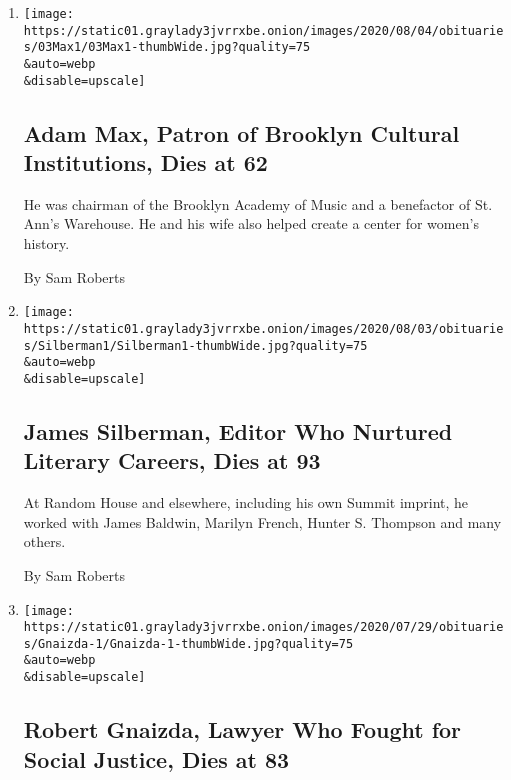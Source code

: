 \begin{enumerate}
\def\labelenumi{\arabic{enumi}.}
\item
  \href{/2020/08/03/arts/adam-max-patron-of-brooklyn-cultural-institutions-dies-at-62.html}{}

  \texttt{[image: https://static01.graylady3jvrrxbe.onion/images/2020/08/04/obituaries/03Max1/03Max1-thumbWide.jpg?quality=75\\\&auto=webp\\\&disable=upscale]}

  \hypertarget{adam-max-patron-of-brooklyn-cultural-institutions-dies-at-62}{%
  \subsection{Adam Max, Patron of Brooklyn Cultural Institutions, Dies
  at
  62}\label{adam-max-patron-of-brooklyn-cultural-institutions-dies-at-62}}

  He was chairman of the Brooklyn Academy of Music and a benefactor of
  St. Ann's Warehouse. He and his wife also helped create a center for
  women's history.

  By Sam Roberts
\item
  \href{/2020/08/01/books/james-silberman-dead.html}{}

  \texttt{[image: https://static01.graylady3jvrrxbe.onion/images/2020/08/03/obituaries/Silberman1/Silberman1-thumbWide.jpg?quality=75\\\&auto=webp\\\&disable=upscale]}

  \hypertarget{james-silberman-editor-who-nurtured-literary-careers-dies-at-93}{%
  \subsection{James Silberman, Editor Who Nurtured Literary Careers,
  Dies at
  93}\label{james-silberman-editor-who-nurtured-literary-careers-dies-at-93}}

  At Random House and elsewhere, including his own Summit imprint, he
  worked with James Baldwin, Marilyn French, Hunter S. Thompson and many
  others.

  By Sam Roberts
\item
  \href{/2020/08/01/us/robert-gnaizda-dead.html}{}

  \texttt{[image: https://static01.graylady3jvrrxbe.onion/images/2020/07/29/obituaries/Gnaizda-1/Gnaizda-1-thumbWide.jpg?quality=75\\\&auto=webp\\\&disable=upscale]}

  \hypertarget{robert-gnaizda-lawyer-who-fought-for-social-justice-dies-at-83}{%
  \subsection{Robert Gnaizda, Lawyer Who Fought for Social Justice, Dies
  at
  83}\label{robert-gnaizda-lawyer-who-fought-for-social-justice-dies-at-83}}


\end{enumerate}

